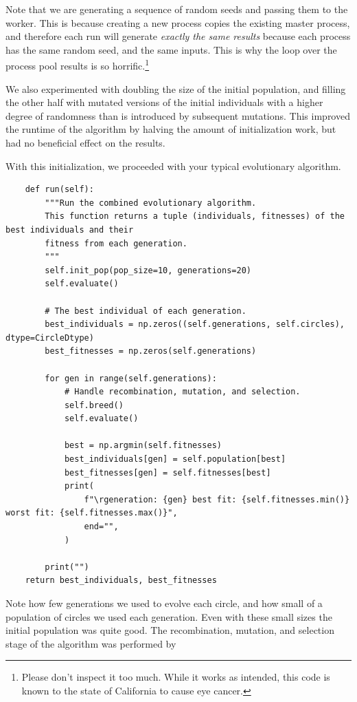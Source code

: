 \documentclass{article}
\begin{document}
Note that we are generating a sequence of random seeds and passing them to the worker. This is
because creating a new process copies the existing master process, and therefore each run will
generate \textit{exactly the same results} because each process has the same random seed, and the
same inputs. This is why the loop over the process pool results is so horrific.\footnote{Please
    don't inspect it too much. While it works as intended, this code is known to the state of
    California to cause eye cancer.}

We also experimented with doubling the size of the initial population, and filling the other half
with mutated versions of the initial individuals with a higher degree of randomness than is
introduced by subsequent mutations. This improved the runtime of the algorithm by halving the
amount of initialization work, but had no beneficial effect on the results.

With this initialization, we proceeded with your typical evolutionary algorithm.

\begin{verbatim}
    def run(self):
        """Run the combined evolutionary algorithm.
        This function returns a tuple (individuals, fitnesses) of the best individuals and their
        fitness from each generation.
        """
        self.init_pop(pop_size=10, generations=20)
        self.evaluate()

        # The best individual of each generation.
        best_individuals = np.zeros((self.generations, self.circles), dtype=CircleDtype)
        best_fitnesses = np.zeros(self.generations)

        for gen in range(self.generations):
            # Handle recombination, mutation, and selection.
            self.breed()
            self.evaluate()

            best = np.argmin(self.fitnesses)
            best_individuals[gen] = self.population[best]
            best_fitnesses[gen] = self.fitnesses[best]
            print(
                f"\rgeneration: {gen} best fit: {self.fitnesses.min()} worst fit: {self.fitnesses.max()}",
                end="",
            )

        print("")
    return best_individuals, best_fitnesses
\end{verbatim}

Note how few generations we used to evolve each circle, and how small of a population of circles we
used each generation. Even with these small sizes the initial population was quite good. The
recombination, mutation, and selection stage of the algorithm was performed by
\end{document}
